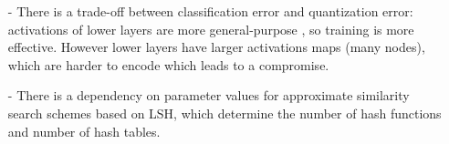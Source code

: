 \documentclass{article}
\begin{document}


 
 
 
\begin{itemize}



\item[-]  There is a trade-off between classification error and quantization error: activations of lower layers are more general-purpose \cite{DBLP:journals/corr/YosinskiCBL14}, so training is more effective. However lower layers have larger  activations maps (many nodes), which are harder to encode which leads to a compromise. 
    

\item[-]  There is a dependency on parameter values  for approximate similarity search schemes based on LSH, which determine the number of hash functions and number of hash tables.  
 
\end{itemize}
\end{document}
